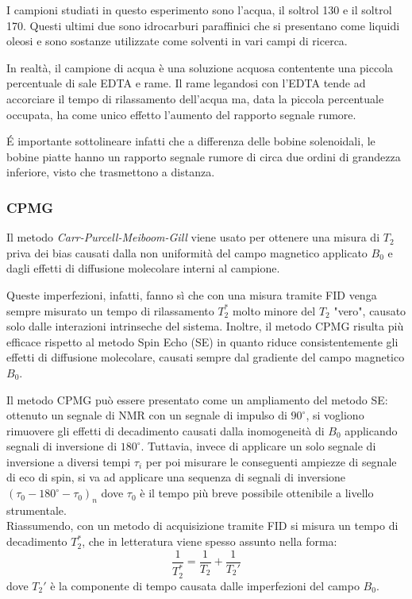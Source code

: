 I campioni studiati in questo esperimento sono l'acqua, il soltrol 130 e il soltrol 170.
Questi ultimi due sono idrocarburi paraffinici che si presentano come liquidi oleosi e sono sostanze utilizzate come solventi in vari campi di ricerca.

In realtà, il campione di acqua è una soluzione acquosa contentente una piccola percentuale di sale EDTA e rame.
Il rame legandosi con l'EDTA tende ad accorciare il tempo di rilassamento dell'acqua ma, data la piccola percentuale occupata, ha come unico effetto l'aumento del rapporto segnale rumore.

\'E importante sottolineare infatti che a differenza delle bobine solenoidali, le bobine piatte hanno un rapporto segnale rumore di circa due ordini di grandezza inferiore, visto che trasmettono a distanza.

\subsubsection*{CPMG}
Il metodo \textit{Carr-Purcell-Meiboom-Gill} viene usato per ottenere una misura di $T_2$ priva dei bias causati dalla non uniformità del campo magnetico applicato $B_0$ e dagli effetti di diffusione molecolare interni al campione.

Queste imperfezioni, infatti, fanno sì che con una misura tramite FID venga sempre misurato un tempo di rilassamento $T_2^*$ molto minore del $T_2$ "vero", causato solo dalle interazioni intrinseche del sistema. Inoltre, il metodo CPMG risulta più efficace rispetto al metodo Spin Echo (SE) in quanto riduce consistentemente gli effetti di diffusione molecolare, causati sempre dal gradiente del campo magnetico $B_0$.

Il metodo CPMG può essere presentato come un ampliamento del metodo SE: ottenuto un segnale di NMR con un segnale di impulso di $90^\circ$, si vogliono rimuovere gli effetti di decadimento causati dalla inomogeneità di $B_0$ applicando segnali di inversione di $180^\circ$. Tuttavia, invece di applicare un solo segnale di inversione a diversi tempi $\tau_i$ per poi misurare le conseguenti ampiezze di segnale di eco di spin, si va ad applicare una sequenza di segnali di inversione $(\tau_0 - 180^\circ - \tau_0)_n$ dove $\tau_0$ è il tempo più breve possibile ottenibile a livello strumentale.\\

Riassumendo, con un metodo di acquisizione tramite FID si misura un tempo di decadimento $T_2^*$, che in letteratura viene spesso assunto nella forma:
\begin{equation}
	\frac{1}{T_2^*} = \frac{1}{T_2} +\frac{1}{T_2'}
\end{equation}
dove $T_2'$ è la componente di tempo causata dalle imperfezioni del campo $B_0$.

